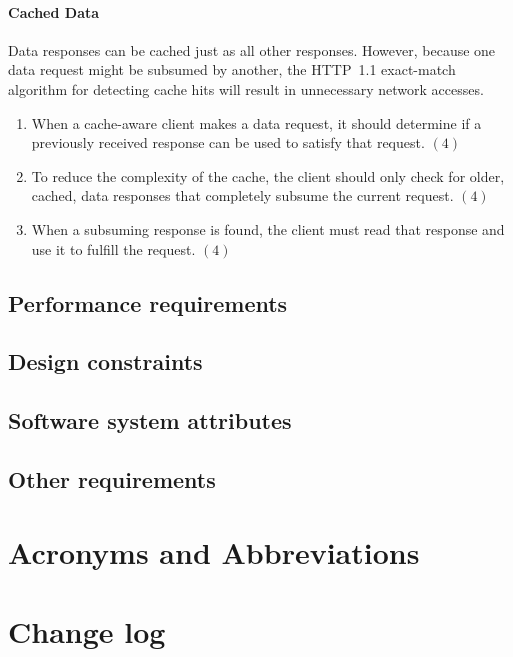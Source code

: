 \documentclass{article}
\begin{document}
\paragraph{Cached Data}
Data responses can be cached just as all other responses. However, because
one data request might be subsumed by another, the HTTP~1.1 exact-match
algorithm for detecting cache hits will result in unnecessary network
accesses. 
\begin{enumerate}
\item When a cache-aware client makes a data request, it should determine if
  a previously received response can be used to satisfy that request. $(4)$
\item To reduce the complexity of the cache, the client should only check for
  older, cached, data responses that completely subsume the current request.
  $(4)$
\item When a subsuming response is found, the client must read that response
  and use it to fulfill the request. $(4)$
\end{enumerate}

\subsection{Performance requirements}
\subsection{Design constraints}
\subsection{Software system attributes}
\subsection{Other requirements}

\appendix

\section{Acronyms and Abbreviations}
\begin{acronym}

\end{acronym}

\section{Change log}
\end{document}
